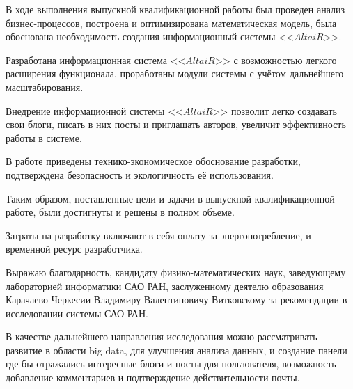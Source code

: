 В ходе выполнения выпускной квалификационной работы был проведен анализ бизнес-процессов, построена и оптимизирована математическая модель, была обоснована необходимость создания информационный системы <<$AltaiR$>>.

Разработана информационная система <<$AltaiR$>> с возможностью легкого расширения функционала, проработаны модули системы с
учётом дальнейшего масштабирования.

Внедрение информационной системы <<$AltaiR$>> позволит легко создавать свои блоги, писать в них посты и приглашать авторов, увеличит эффективность работы в системе.

В работе приведены технико-экономическое обоснование разработки, подтверждена безопасность и экологичность её использования.

Таким образом, поставленные цели и задачи в выпускной квалификационной работе, были достигнуты и решены в полном объеме.

Затраты на разработку включают в себя оплату за энергопотребление, и временной ресурс разработчика.   

Выражаю благодарность, кандидату физико-математических наук, заведующему лабораторией информатики САО РАН, заслуженному деятелю образования Карачаево-Черкесии Владимиру Валентиновичу Витковскому за рекомендации в исследовании системы САО РАН.   

В качестве дальнейшего направления исследования можно рассматривать развитие в области big data, для улучшения анализа данных, и создание панели где бы отражались интересные блоги и посты для пользователя, возможность добавление комментариев и подтверждение действительности почты.

\pagebreak